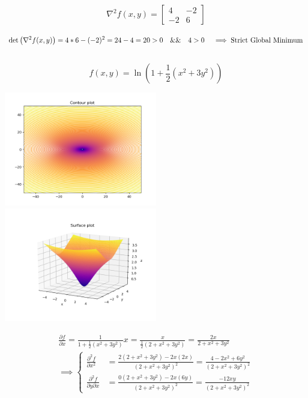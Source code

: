 \documentclass[12pt]{article}         %
\begin{document}
\begin{gather}
\nabla^2 f(x,y) = 
  \begin{bmatrix}
   4 &
   -2\\
   -2 &
   6 
   \end{bmatrix}
   \nonumber
\end{gather}

$$
\det\left(\nabla^2 f(x,y)\right) = 4*6-(-2)^2=24-4=20 >0  \quad \&\& \quad 4 > 0 \quad\implies \text{Strict Global Minimum}\\ %
$$\\


\begin{equation}
	f(x,y) = \ln(1 + \dfrac{1}{2}(x^2 +3y^2))
\end{equation}

\includegraphics[width=0.5\textwidth]{Figure_4}
\includegraphics[width=0.5\textwidth]{Surface_4}

$$
\begin{aligned}
\frac {\partial f}{\partial x} = \frac{1}{1+\frac{1}{2}(x^2+3y^2)}x= \frac{x}{\frac{1}{2}(2+x^2+3y^2)}=\frac{2x}{2+x^2+3y^2}\\
\implies 
	\left\{
	\begin{aligned}
		\frac {\partial^2 f}{\partial x^2}&=\frac{2(2+x^2+3y^2)-2x(2x)}{(2+x^2+3y^2)^2}=
		 	\frac{4-2x^2+6y^2}{(2+x^2+3y^2)^2} \\
		\frac {\partial^2 f}{\partial y \partial x}&=\frac{0(2+x^2+3y^2)-2x(6y)}{(2+x^2+3y^2)^2}=
		 	\frac{-12xy}{(2+x^2+3y^2)^2} 
	 \end{aligned} 
	 \right.
\end{aligned}
$$
\end{document}

